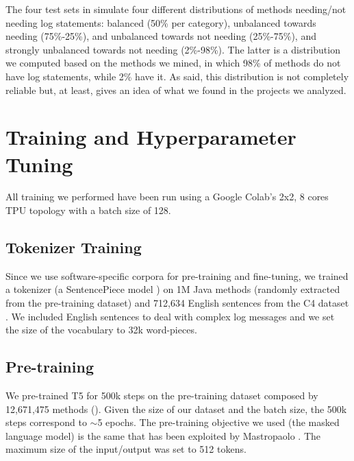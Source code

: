 The four test sets in  simulate four different distributions of methods needing/not needing log statements: balanced (50\% per category), unbalanced towards needing (75\%-25\%), and unbalanced towards not needing (25\%-75\%), and strongly unbalanced towards not needing (2\%-98\%). The latter is a distribution we computed based on the methods we mined, in which 98\% of methods do not have log statements, while 2\% have it. As said, this distribution is not completely reliable but, at least, gives an idea of what we found in the projects we analyzed.



\section{Training and Hyperparameter Tuning} \label{sec:training}
All training we performed have been run using a Google Colab's 2x2, 8 cores TPU topology with a batch size of 128.

\subsection{Tokenizer Training}
Since we use software-specific corpora for pre-training and fine-tuning, we trained a tokenizer (\ie a SentencePiece model \cite{kudo2018sentencepiece}) on 1M Java methods (randomly extracted from the pre-training dataset) and 712,634 English sentences from the C4 dataset \cite{raffel2019exploring}. We included English sentences to deal with complex log messages and we set the size of the vocabulary to 32k word-pieces. 

\subsection{Pre-training}
We pre-trained T5 for 500k steps on the pre-training dataset composed by 12,671,475 \java methods (). Given the size of our dataset and the batch size, the 500k steps correspond to $\sim$5 epochs. The pre-training objective we used (\ie the masked language model) is the same that has been exploited by Mastropaolo \etal \cite{mastropaolo2022using}. The maximum size of the input/output was set to 512 tokens.

